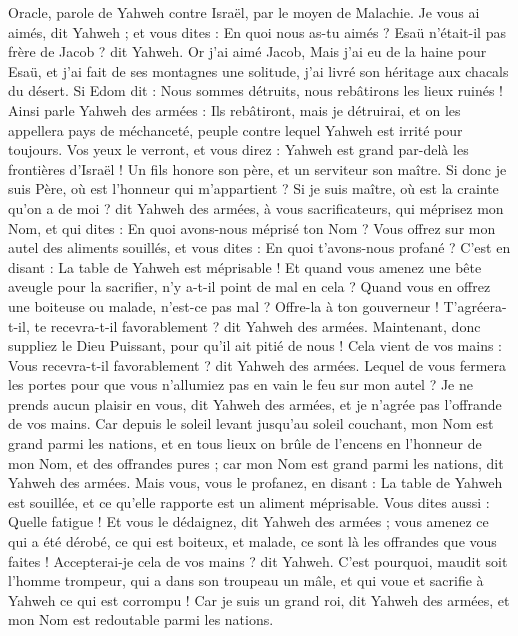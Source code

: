 \begin{multicols}{2}
\VerseOne{}Oracle, parole de Yahweh contre Israël, par le moyen de Malachie.
Je vous ai aimés, dit Yahweh ; et vous dites : En quoi nous as-tu aimés ? Esaü n'était-il pas frère de Jacob ? dit Yahweh. Or j'ai aimé Jacob,
Mais j'ai eu de la haine pour Esaü, et j'ai fait de ses montagnes une solitude, j’ai livré son héritage aux chacals du désert.
Si Edom dit : Nous sommes détruits, nous rebâtirons les lieux ruinés ! Ainsi parle Yahweh des armées : Ils rebâtiront, mais je détruirai, et on les appellera pays de méchanceté, peuple contre lequel Yahweh est irrité pour toujours.
Vos yeux le verront, et vous direz : Yahweh est grand par-delà les frontières d'Israël !
Un fils honore son père, et un serviteur son maître. Si donc je suis Père, où est l'honneur qui m'appartient ? Si je suis maître, où est la crainte qu'on a de moi ? dit Yahweh des armées, à vous sacrificateurs, qui méprisez mon Nom, et qui dites : En quoi avons-nous méprisé ton Nom ?
Vous offrez sur mon autel des aliments souillés, et vous dites : En quoi t'avons-nous profané ? C'est en disant : La table de Yahweh est méprisable !
Et quand vous amenez une bête aveugle pour la sacrifier, n'y a-t-il point de mal en cela ? Quand vous en offrez une boiteuse ou malade, n’est-ce pas mal ? Offre-la à ton gouverneur ! T’agréera-t-il, te recevra-t-il favorablement ? dit Yahweh des armées.
Maintenant, donc suppliez le Dieu Puissant, pour qu'il ait pitié de nous ! Cela vient de vos mains : Vous recevra-t-il favorablement ? dit Yahweh des armées.
Lequel de vous fermera les portes pour que vous n’allumiez pas en vain le feu sur mon autel ? Je ne prends aucun plaisir en vous, dit Yahweh des armées, et je n’agrée pas l'offrande de vos mains.
Car depuis le soleil levant jusqu'au soleil couchant, mon Nom est grand parmi les nations, et en tous lieux on brûle de l’encens en l'honneur de mon Nom, et des offrandes pures ; car mon Nom est grand parmi les nations, dit Yahweh des armées.
Mais vous, vous le profanez, en disant : La table de Yahweh est souillée, et ce qu’elle rapporte est un aliment méprisable.
Vous dites aussi : Quelle fatigue ! Et vous le dédaignez, dit Yahweh des armées ; vous amenez ce qui a été dérobé, ce qui est boiteux, et malade, ce sont là les offrandes que vous faites ! Accepterai-je cela de vos mains ? dit Yahweh.
C'est pourquoi, maudit soit l'homme trompeur, qui a dans son troupeau un mâle, et qui voue et sacrifie à Yahweh ce qui est corrompu ! Car je suis un grand roi, dit Yahweh des armées, et mon Nom est redoutable parmi les nations.

\end{multicols}
